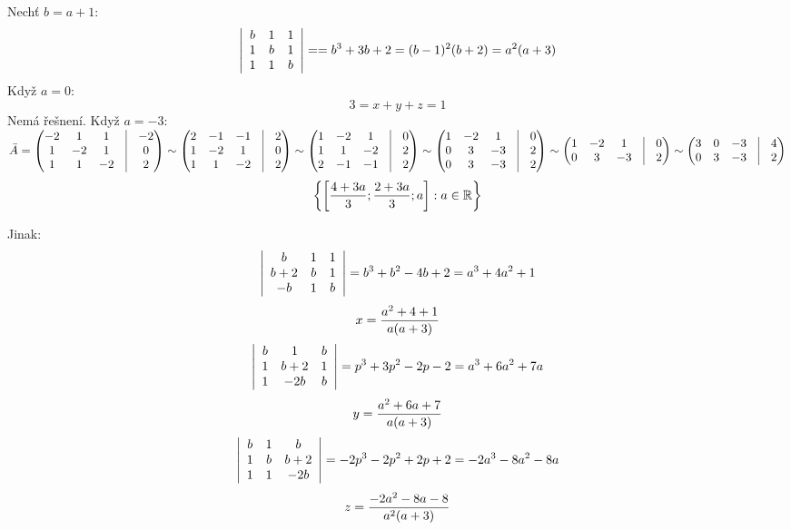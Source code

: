 Nechť $b=a+1$:
$$\left| \begin{array}{ccc} b&1&1\\1&b&1\\1&1&b\end{array} \right| = = b^3+3b+2 = (b-1)^2(b+2)=a^2(a+3)$$
Když $a=0$:
$$3= x+y+z = 1$$
Nemá řešnení.
Když $a=-3$:
 $ \bar{A} = \begin{pmatrix}
-2 &1 &1 &\vline& -2 \\
1 &-2 &1 &\vline& 0 \\
1 &1 &-2 &\vline& 2 \\
\end{pmatrix}
\sim
\begin{pmatrix}
2 &-1 &-1 &\vline& 2 \\
1 &-2 &1 &\vline& 0 \\
1 &1 &-2 &\vline& 2 \\
\end{pmatrix}
\sim
\begin{pmatrix}
1 &-2 &1 &\vline& 0 \\
1 &1 &-2 &\vline& 2 \\
2 &-1 &-1 &\vline& 2 \\
\end{pmatrix}
\sim
\begin{pmatrix}
1 &-2 &1 &\vline& 0 \\
0 &3 &-3 &\vline& 2 \\
0 &3 &-3 &\vline& 2 \\
\end{pmatrix}
\sim
\begin{pmatrix}
1 &-2 &1 &\vline& 0 \\
0 &3 &-3 &\vline& 2 \\
\end{pmatrix}
\sim
\begin{pmatrix}
3 &0 &-3 &\vline& 4 \\
0 &3 &-3 &\vline& 2 \\
\end{pmatrix}
 $
 $$
 \left\{{\left[{\frac{4+3 a}{3}; \frac{2+3 a}{3}; a}\right]:a \in \mathbb{R}}\right\}
 $$

 Jinak:
	$$\left| \begin{array}{ccc} b&1&1\\b+2&b&1\\-b&1&b\end{array} \right| = b^3+b^2-4b+2 = a^3+4a^2+1$$
		$$ x = \frac{a^2+4+1}{a(a+3)} $$
	$$\left| \begin{array}{ccc} b&1&b\\1&b+2&1\\1&-2b&b\end{array} \right| = p^3+3p^2-2p-2 = a^3+6a^2+7a$$
		$$ y = \frac{a^2+6a+7}{a(a+3)} $$
	$$\left| \begin{array}{ccc} b&1&b\\1&b&b+2\\1&1&-2b\end{array} \right| = -2p^3-2p^2+2p+2 = -2a^3-8a^2-8a $$
		$$ z = \frac{-2a^2-8a-8}{a^2(a+3)} $$

